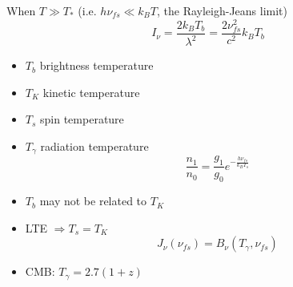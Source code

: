 
When $T \gg T_*$ (i.e. $h\nu_{fs} \ll k_BT$, the Rayleigh-Jeans limit)
$$I_\nu = \frac{2k_BT_b}{\lambda^2} = \frac{2\nu_{fs}^2}{c^2}k_BT_b$$
\begin{itemize}
	\item $T_b$ brightness temperature
	\item $T_K$ kinetic temperature
	\item $T_s$ spin temperature
	\item $T_\gamma$ radiation temperature
		$$\frac{n_1}{n_0} = \frac{g_1}{g_0}e^{-\frac{h\nu_{fs}}{k_BT_s}}$$
	\item $T_b$ may not be related to $T_K$
	\item LTE $\Rightarrow T_s = T_K$ 
		$$J_\nu(\nu_{fs}) = B_\nu(T_\gamma, \nu_{fs})$$
	\item CMB: $T_\gamma = 2.7(1+z)$
\end{itemize}

